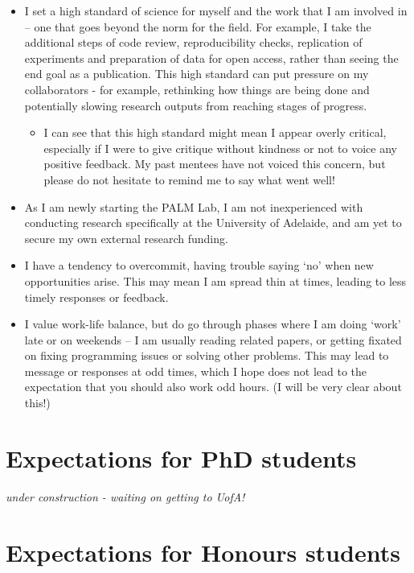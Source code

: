 \documentclass[
]{book}
\providecommand{\tightlist}{%
  \setlength{\itemsep}{0pt}\setlength{\parskip}{0pt}}
\begin{document}
\begin{itemize}
\tightlist
\item
  I set a high standard of science for myself and the work that I am involved in -- one that goes beyond the norm for the field. For example, I take the additional steps of code review, reproducibility checks, replication of experiments and preparation of data for open access, rather than seeing the end goal as a publication. This high standard can put pressure on my collaborators - for example, rethinking how things are being done and potentially slowing research outputs from reaching stages of progress.

  \begin{itemize}
  \tightlist
  \item
    I can see that this high standard might mean I appear overly critical, especially if I were to give critique without kindness or not to voice any positive feedback. My past mentees have not voiced this concern, but please do not hesitate to remind me to say what went well!
  \end{itemize}
\item
  As I am newly starting the PALM Lab, I am not inexperienced with conducting research specifically at the University of Adelaide, and am yet to secure my own external research funding.
\item
  I have a tendency to overcommit, having trouble saying `no' when new opportunities arise. This may mean I am spread thin at times, leading to less timely responses or feedback.
\item
  I value work-life balance, but do go through phases where I am doing `work' late or on weekends -- I am usually reading related papers, or getting fixated on fixing programming issues or solving other problems. This may lead to message or responses at odd times, which I hope does not lead to the expectation that you should also work odd hours. (I will be very clear about this!)
\end{itemize}

\hypertarget{student-expectations}{%
\section{Expectations for PhD students}\label{student-expectations}}

\emph{under construction - waiting on getting to UofA!}

\hypertarget{expectations-for-honours-students}{%
\section{Expectations for Honours students}\label{expectations-for-honours-students}}
\end{document}
